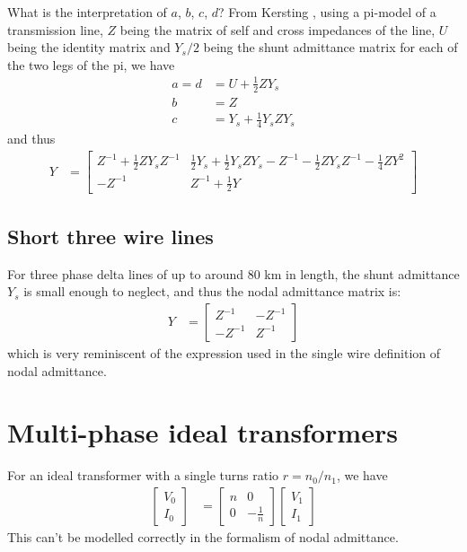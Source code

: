 \documentclass[11pt]{article}
\begin{document}
What is the interpretation of $a$, $b$, $c$, $d$? From Kersting \cite{KerstingXXXXa}, using a pi-model of a transmission line, $Z$ being the matrix of self and cross impedances of the line, $U$ being the identity matrix and $Y_s/2$ being the shunt admittance matrix for each of the two legs of the pi, we have
\begin{align}
a = d &= U + \frac{1}{2}ZY_s \\
b &= Z \\
c &= Y_s + \frac{1}{4}Y_s Z Y_s
\end{align}
and thus
\begin{align}
Y &= \begin{bmatrix} Z^{-1} + \frac{1}{2}ZY_sZ^{-1} & \frac{1}{2}Y_s + \frac{1}{2}Y_sZY_s - Z^{-1}-\frac{1}{2}ZY_sZ^{-1}-\frac{1}{4}ZY^2 \\
-Z^{-1} & Z^{-1}+\frac{1}{2}Y \end{bmatrix} 
\end{align}
\subsection{Short three wire lines}
For three phase delta lines of up to around 80 km in length, the shunt admittance $Y_s$ is small enough to neglect, and thus the nodal admittance matrix is:
\begin{align}
	Y &=
	\begin{bmatrix} Z^{-1} & -Z^{-1} \\ -Z^{-1} & Z^{-1} \end{bmatrix}
\end{align}
which is very reminiscent of the expression used in the single wire definition of nodal admittance.
\section{Multi-phase ideal transformers}
For an ideal transformer with a single turns ratio $r = n_0/n_1$, we have
\begin{align}
\begin{bmatrix}V_0 \\ I_0\end{bmatrix} &= \begin{bmatrix}n & 0 \\ 0 & -\frac{1}{n}\end{bmatrix}\begin{bmatrix}V_1 \\ I_1 \end{bmatrix}
\end{align}
This can't be modelled correctly in the formalism of nodal admittance.
\end{document}
